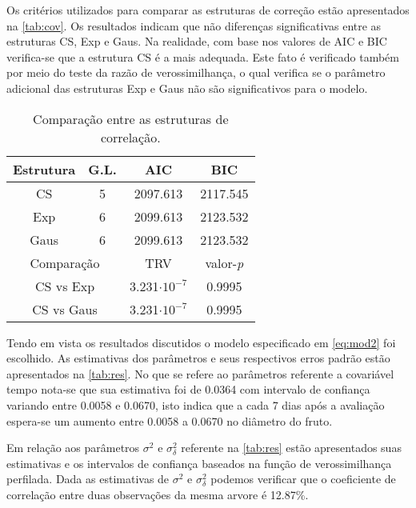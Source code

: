 \documentclass[12pt,a4paper,final]{article}
\begin{document}
Os critérios utilizados para comparar as estruturas de correção estão apresentados na \autoref{tab:cov}. 
Os resultados indicam que não diferenças significativas entre as estruturas CS, Exp e Gaus. Na realidade, com base
nos valores de AIC e BIC verifica-se que a estrutura CS é a mais adequada. Este fato é verificado também por meio
do teste da razão de verossimilhança, o qual verifica se o parâmetro adicional das estruturas Exp e Gaus não são 
significativos para o modelo.

\begin{table}[H]
	\centering
	\caption{Comparação entre as estruturas de correlação.}
	\onehalfspacing
	\label{tab:cov}
\begin{tabular}{cccc}\toprule
	Estrutura & G.L. & AIC & BIC \\ \midrule
	CS        & 5    & 2097.613 & 2117.545\\
	Exp       & 6    & 2099.613 & 2123.532\\
	Gaus      &  6   & 2099.613  &2123.532 \\ \midrule
	\multicolumn{2}{c}{Comparação} & TRV & valor-\emph{p} \\ \midrule
	\multicolumn{2}{c}{CS vs Exp} & 3.231$\cdot10^{-7}$ & 0.9995\\ 
	\multicolumn{2}{c}{CS vs Gaus} & 3.231$\cdot10^{-7}$ & 0.9995\\ \bottomrule
\end{tabular}
\end{table}

Tendo em vista os resultados discutidos o modelo especificado em \eqref{eq:mod2} foi escolhido. As estimativas dos
parâmetros e seus respectivos erros padrão estão apresentados na \autoref{tab:res}. No que se refere ao parâmetros 
referente a covariável tempo nota-se que sua estimativa foi de 0.0364 com intervalo de confiança variando entre 
0.0058 e 0.0670, isto indica que a cada 7 dias após a avaliação espera-se um aumento entre 0.0058 a 0.0670 no diâmetro
do fruto.

\newpage
Em relação aos parâmetros $\sigma^2$ e $\sigma^2_\delta$ referente na \autoref{tab:res} estão apresentados
suas estimativas e os intervalos de confiança baseados na função de verossimilhança perfilada. Dada as estimativas
de $\sigma^2$ e $\sigma^2_\delta$ podemos verificar que o coeficiente de correlação entre duas observações da 
mesma arvore é 12.87\%.
\end{document}
